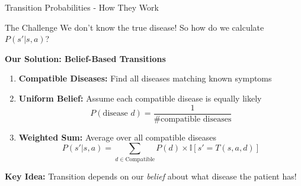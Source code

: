 \documentclass[aspectratio=169]{beamer}
\begin{document}
\begin{frame}{Transition Probabilities - How They Work}
    \begin{block}{The Challenge}
        We don't know the true disease! So how do we calculate $P(s'|s, a)$?
    \end{block}
    
    \vspace{0.3cm}
    
    \textbf{Our Solution: Belief-Based Transitions}
    
    \vspace{0.3cm}
    
    \begin{enumerate}
        \item \textbf{Compatible Diseases:} Find all diseases matching known symptoms
        
        \item \textbf{Uniform Belief:} Assume each compatible disease is equally likely
        \[P(\text{disease } d) = \frac{1}{\text{\# compatible diseases}}\]
        
        \item \textbf{Weighted Sum:} Average over all compatible diseases
        \[P(s'|s, a) = \sum_{d \in \text{Compatible}} P(d) \times \mathbb{I}[s' = T(s, a, d)]\]
    \end{enumerate}
    
    \vspace{0.3cm}
    
    \textbf{Key Idea:} Transition depends on our \emph{belief} about what disease the patient has!
\end{frame}
\end{document}
